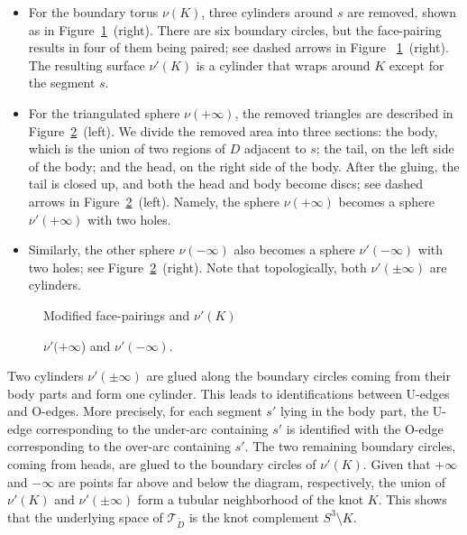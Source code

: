 \documentclass[12pt,reqno]{amsart}
\theoremstyle{definition}
\def\calT{\mathcal T}
\renewcommand{\Ddot}{\mathring{D}}
\begin{document}
\begin{itemize}
\item
  For the boundary torus $\nu(K)$, three cylinders around $s$ are removed, shown as
  in Figure~\ref{fig.region}~(right). There are six boundary circles, but the
  face-pairing results in four of them being paired; see dashed arrows in Figure
  ~\ref{fig.region}~(right). The resulting surface $\nu'(K)$ is  a cylinder that
  wraps around $K$ except for the segment $s$. 
\item
  For the triangulated sphere $\nu(+\infty)$, the removed triangles are described in
  Figure~\ref{fig.drawing}~(left). We divide the removed area into three sections: the
  body, which is the union of two regions of $D$ adjacent to $s$; the tail,
  on the left  side of the body; and the head, on the right side of the body.
  After the gluing, the tail is closed up, and both the head and body become discs; see
  dashed arrows in Figure~\ref{fig.drawing}~(left).  Namely, the sphere $\nu(+\infty)$
  becomes a sphere $\nu'(+\infty)$ with two holes.
\item
  Similarly, the other sphere $\nu(-\infty)$ also becomes a sphere  $\nu'(-\infty)$
  with two holes; see Figure~\ref{fig.drawing}~(right).
  Note that topologically, both $\nu'(\pm \infty)$ are cylinders.
\end{itemize}

\begin{figure}[htpb!]

\caption{Modified face-pairings and $\nu'(K)$}
\label{fig.region}
\end{figure}

\begin{figure}[htpb!]

\caption{$\nu'(+\infty$) and $\nu'(-\infty)$.}
\label{fig.drawing}
\end{figure}

Two cylinders $\nu'(\pm \infty)$ are glued along the boundary circles coming from
their body parts and form one cylinder. This leads to identifications between U-edges
and O-edges. More precisely, for each segment $s'$ lying in the body part, the U-edge
corresponding to the under-arc containing $s'$ is identified with the O-edge
corresponding to the over-arc containing $s'$. The two remaining boundary circles,
coming from heads, are glued to the boundary circles of $\nu'(K)$. Given that $+\infty$
and $-\infty$ are points far above and below the diagram, respectively, the union of
$\nu'(K)$ and $\nu'(\pm \infty)$ form a tubular neighborhood of the knot $K$. This
shows that the underlying space of $\calT_{\Ddot}$ is the knot complement
$S^3 \setminus K$.
\end{document}
